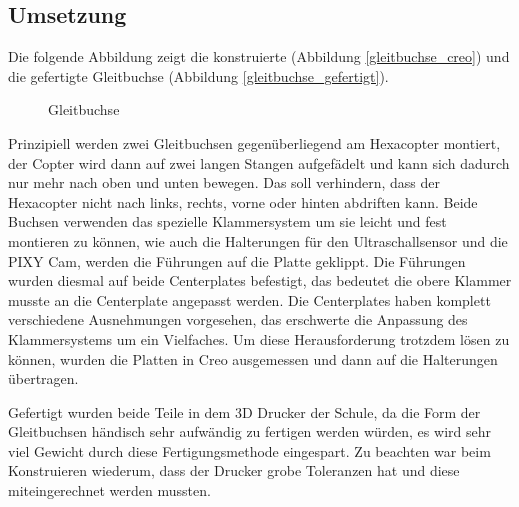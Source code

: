 	\subsection{Umsetzung}

	Die folgende Abbildung zeigt die konstruierte (Abbildung \ref{gleitbuchse_creo}) und die gefertigte Gleitbuchse (Abbildung \ref{gleitbuchse_gefertigt}).

			\begin{figure}[tbh]
				\begin{centering}
				\par\end{centering}
				\caption{Gleitbuchse}
				\label{Gleitbuchse}
			\end{figure}

	Prinzipiell werden zwei Gleitbuchsen gegenüberliegend am Hexacopter montiert, der Copter wird dann auf zwei langen Stangen aufgefädelt und kann sich dadurch nur mehr nach oben und unten bewegen.
	Das soll verhindern, dass der Hexacopter nicht nach links, rechts, vorne oder hinten abdriften kann.
	Beide Buchsen verwenden das spezielle Klammersystem um sie leicht und fest montieren zu können, wie auch die Halterungen für den Ultraschallsensor und die PIXY Cam, werden die Führungen auf die Platte geklippt.
	Die Führungen wurden diesmal auf beide Centerplates befestigt, das bedeutet die obere Klammer musste an die Centerplate angepasst werden.
	Die Centerplates haben komplett verschiedene Ausnehmungen vorgesehen, das erschwerte die Anpassung des Klammersystems um ein Vielfaches.
	Um diese Herausforderung trotzdem lösen zu können, wurden die Platten in Creo ausgemessen und dann auf die Halterungen übertragen.

	Gefertigt wurden beide Teile in dem 3D Drucker der Schule, da die Form der Gleitbuchsen händisch sehr aufwändig zu fertigen werden würden, \bzw es wird sehr viel Gewicht durch diese Fertigungsmethode eingespart.
	Zu beachten war beim Konstruieren wiederum, dass der Drucker grobe Toleranzen hat und diese miteingerechnet werden mussten.

